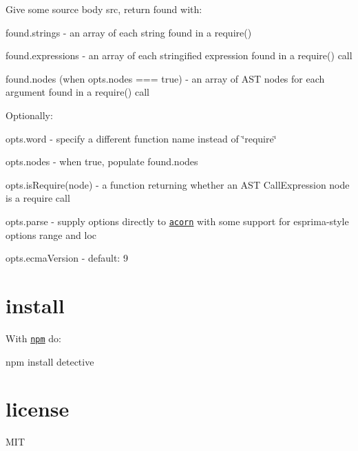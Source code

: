 Give some source body {\ttfamily src}, return {\ttfamily found} with\+:


\begin{DoxyItemize}
\item {\ttfamily found.\+strings} -\/ an array of each string found in a {\ttfamily require()}
\item {\ttfamily found.\+expressions} -\/ an array of each stringified expression found in a {\ttfamily require()} call
\item {\ttfamily found.\+nodes} (when {\ttfamily opts.\+nodes === true}) -\/ an array of A\+ST nodes for each argument found in a {\ttfamily require()} call
\end{DoxyItemize}

Optionally\+:


\begin{DoxyItemize}
\item {\ttfamily opts.\+word} -\/ specify a different function name instead of {\ttfamily \char`\"{}require\char`\"{}}
\item {\ttfamily opts.\+nodes} -\/ when {\ttfamily true}, populate {\ttfamily found.\+nodes}
\item {\ttfamily opts.\+is\+Require(node)} -\/ a function returning whether an A\+ST {\ttfamily Call\+Expression} node is a require call
\item {\ttfamily opts.\+parse} -\/ supply options directly to \href{https://npmjs.org/package/acorn}{\tt acorn} with some support for esprima-\/style options {\ttfamily range} and {\ttfamily loc}
\item {\ttfamily opts.\+ecma\+Version} -\/ default\+: 9
\end{DoxyItemize}

\section*{install}

With \href{https://npmjs.org}{\tt npm} do\+:


\begin{DoxyCode}
npm install detective
\end{DoxyCode}


\section*{license}

M\+IT 